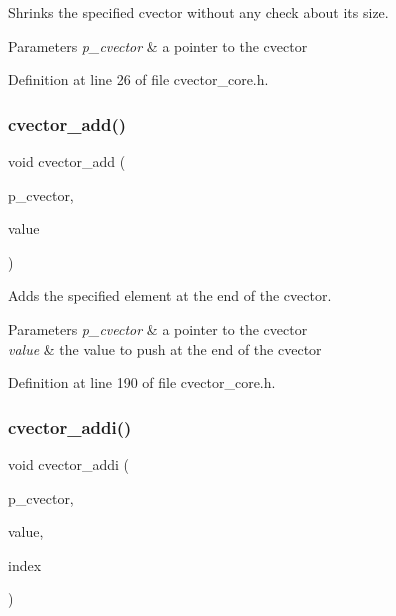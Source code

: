Shrinks the specified cvector without any check about its size. 
\begin{DoxyParams}{Parameters}
{\em p\+\_\+cvector} & a pointer to the cvector \\
\hline
\end{DoxyParams}


Definition at line 26 of file cvector\+\_\+core.\+h.

\mbox{\label{cvector__core_8h_ad504959e360214da1255d28534b1d3a4}} 
\subsubsection{cvector\+\_\+add()}
{\footnotesize\ttfamily void cvector\+\_\+add (\begin{DoxyParamCaption}\item[{\textbf{ cvector} $\ast$}]{p\+\_\+cvector,  }\item[{\textbf{ value\+\_\+t}}]{value }\end{DoxyParamCaption})}

Adds the specified element at the end of the cvector. 
\begin{DoxyParams}{Parameters}
{\em p\+\_\+cvector} & a pointer to the cvector \\
\hline
{\em value} & the value to push at the end of the cvector \\
\hline
\end{DoxyParams}


Definition at line 190 of file cvector\+\_\+core.\+h.

\mbox{\label{cvector__core_8h_aded13abbf232cf0d65c889cb806cee0b}} 
\subsubsection{cvector\+\_\+addi()}
{\footnotesize\ttfamily void cvector\+\_\+addi (\begin{DoxyParamCaption}\item[{\textbf{ cvector} $\ast$}]{p\+\_\+cvector,  }\item[{\textbf{ value\+\_\+t}}]{value,  }\item[{\textbf{ index\+\_\+t}}]{index }\end{DoxyParamCaption})}

